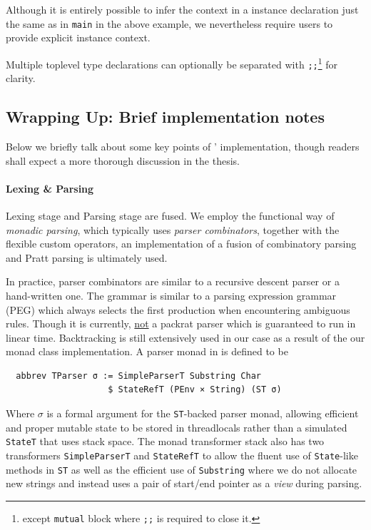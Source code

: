 \documentclass[a4paper, 11pt]{article}
\theoremstyle{remark}\newtheorem*{remark}{Remark}
\theoremstyle{definition}\newtheorem*{definition}{Definition}
\begin{document}
Although it is entirely possible to infer the context in a instance declaration just the same as in
\texttt{main} in the above example, we nevertheless require users to provide explicit instance context.

Multiple toplevel type declarations can optionally be separated
with \texttt{;;}\footnote{except \texttt{mutual} block where \texttt{;;} is required to close it.}
for clarity.
\subsection{Wrapping Up: Brief implementation notes}
Below we briefly talk about some key points of \Tigris' implementation, though readers shall expect a more
thorough discussion in the thesis.
\paragraph{Lexing \& Parsing} Lexing stage and Parsing stage are fused.
We employ the functional way of \emph{monadic parsing}, which typically uses \emph{parser combinators},
together with the flexible custom operators, an implementation of a fusion of combinatory parsing and Pratt parsing
is ultimately used.

In practice, parser combinators are similar to a recursive descent parser or a hand-written one. The grammar
is similar to a parsing expression grammar (PEG) which always selects the first production when encountering
ambiguous rules. Though it is currently, \underline{not} a packrat parser which is guaranteed to run in linear time.
Backtracking is still extensively used in our case as a result of the our monad class implementation. A parser monad
in \Tigris is defined to be

\begin{verbatim}
  abbrev TParser σ := SimpleParserT Substring Char
                    $ StateRefT (PEnv × String) (ST σ)
\end{verbatim}
Where \(\sigma\) is a formal argument for the \texttt{ST}-backed parser monad, allowing efficient
and proper mutable state to be stored in threadlocals rather than a simulated \texttt{StateT} that uses stack space.
The monad transformer stack also has two transformers \texttt{SimpleParserT} and \texttt{StateRefT}
to allow the fluent use of \texttt{State}-like
methods in \texttt{ST} as well as the efficient use of \texttt{Substring} where we do not
allocate new strings and instead uses a pair of start/end pointer as a \emph{view} during parsing.
\end{document}
